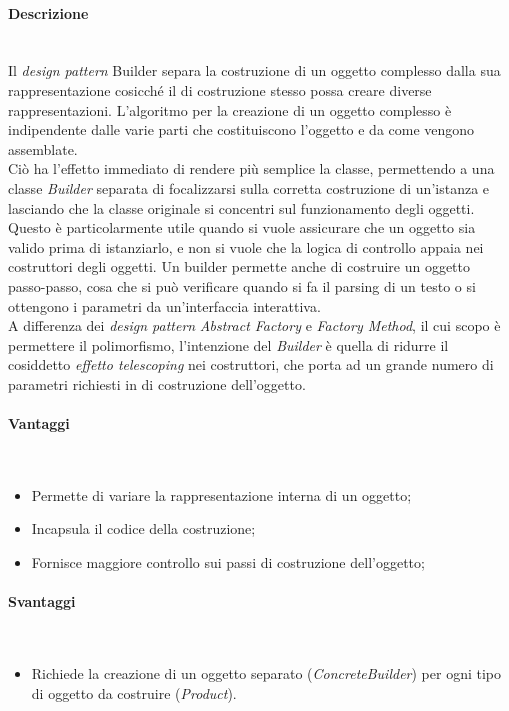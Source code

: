 \paragraph{Descrizione} \mbox{} \\
Il \textit{design pattern} Builder separa la costruzione di un oggetto complesso dalla sua rappresentazione cosicché il  di costruzione stesso possa creare diverse rappresentazioni. L'algoritmo per la creazione di un oggetto complesso è indipendente dalle varie parti che costituiscono l'oggetto e da come vengono assemblate. \\
Ciò ha l'effetto immediato di rendere più semplice la classe, permettendo a una classe \textit{Builder} separata di focalizzarsi sulla corretta costruzione di un'istanza e lasciando che la classe originale si concentri sul funzionamento degli oggetti. Questo è particolarmente utile quando si vuole assicurare che un oggetto sia valido prima di istanziarlo, e non si vuole che la logica di controllo appaia nei costruttori degli oggetti. Un builder permette anche di costruire un oggetto passo-passo, cosa che si può verificare quando si fa il parsing di un testo o si ottengono i parametri da un'interfaccia interattiva. \\
A differenza dei \textit{design pattern} \textit{Abstract Factory} e \textit{Factory Method}, il cui scopo è permettere il polimorfismo, l'intenzione del \textit{Builder} è quella di ridurre il cosiddetto \textit{effetto telescoping} nei costruttori, che porta ad un grande numero di parametri richiesti in  di costruzione dell'oggetto.
\paragraph{Vantaggi} \mbox{} \\
\begin{itemize}
\item Permette di variare la rappresentazione interna di un oggetto;
\item Incapsula il codice della costruzione;
\item Fornisce maggiore controllo sui passi di costruzione dell'oggetto;
\end{itemize}
\paragraph{Svantaggi} \mbox{} \\
\begin{itemize}
\item Richiede la creazione di un oggetto separato (\textit{ConcreteBuilder}) per ogni tipo di oggetto da costruire (\textit{Product}).
\end{itemize}
